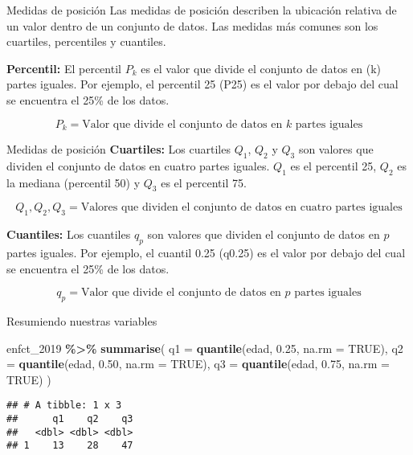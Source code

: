\documentclass[
  ignorenonframetext,
]{beamer}
\newenvironment{Shaded}{\begin{snugshade}}{\end{snugshade}}
\newcommand{\AttributeTok}[1]{\textcolor[rgb]{0.13,0.29,0.53}{#1}}
\newcommand{\ConstantTok}[1]{\textcolor[rgb]{0.56,0.35,0.01}{#1}}
\newcommand{\FloatTok}[1]{\textcolor[rgb]{0.00,0.00,0.81}{#1}}
\newcommand{\FunctionTok}[1]{\textcolor[rgb]{0.13,0.29,0.53}{\textbf{#1}}}
\newcommand{\NormalTok}[1]{#1}
\newcommand{\SpecialCharTok}[1]{\textcolor[rgb]{0.81,0.36,0.00}{\textbf{#1}}}
\begin{document}
\begin{frame}{Medidas de posición}
\label{medidas-de-posiciuxf3n}
Las medidas de posición describen la ubicación relativa de un valor
dentro de un conjunto de datos. Las medidas más comunes son los
cuartiles, percentiles y cuantiles.

\textbf{Percentil:} El percentil \(P_k\) es el valor que divide el
conjunto de datos en (k) partes iguales. Por ejemplo, el percentil 25
(P25) es el valor por debajo del cual se encuentra el 25\% de los datos.

\[
P_k = \text{Valor que divide el conjunto de datos en } k \text{ partes iguales}
\]
\end{frame}

\begin{frame}{Medidas de posición}
\label{medidas-de-posiciuxf3n-1}
\textbf{Cuartiles:} Los cuartiles \(Q_1\), \(Q_2\) y \(Q_3\) son valores
que dividen el conjunto de datos en cuatro partes iguales. \(Q_1\) es el
percentil 25, \(Q_2\) es la mediana (percentil 50) y \(Q_3\) es el
percentil 75.

\[
Q_1, Q_2, Q_3 = \text{Valores que dividen el conjunto de datos en cuatro partes iguales}
\]

\textbf{Cuantiles:} Los cuantiles \(q_p\) son valores que dividen el
conjunto de datos en \(p\) partes iguales. Por ejemplo, el cuantil 0.25
(q0.25) es el valor por debajo del cual se encuentra el 25\% de los
datos.

\[
q_p = \text{Valor que divide el conjunto de datos en } p \text{ partes iguales}
\]
\end{frame}

\begin{frame}[fragile]{Resumiendo nuestras variables}
\label{resumiendo-nuestras-variables}
\begin{Shaded}
\begin{Highlighting}[]
\NormalTok{enfct\_2019 }\SpecialCharTok{\%\textgreater{}\%} 
  \FunctionTok{summarise}\NormalTok{(}
    \AttributeTok{q1 =} \FunctionTok{quantile}\NormalTok{(edad, }\FloatTok{0.25}\NormalTok{, }\AttributeTok{na.rm =} \ConstantTok{TRUE}\NormalTok{),}
    \AttributeTok{q2 =} \FunctionTok{quantile}\NormalTok{(edad, }\FloatTok{0.50}\NormalTok{, }\AttributeTok{na.rm =} \ConstantTok{TRUE}\NormalTok{),}
    \AttributeTok{q3 =} \FunctionTok{quantile}\NormalTok{(edad, }\FloatTok{0.75}\NormalTok{, }\AttributeTok{na.rm =} \ConstantTok{TRUE}\NormalTok{)}
\NormalTok{  )}
\end{Highlighting}
\end{Shaded}

\begin{verbatim}
## # A tibble: 1 x 3
##      q1    q2    q3
##   <dbl> <dbl> <dbl>
## 1    13    28    47
\end{verbatim}
\end{frame}
\end{document}
